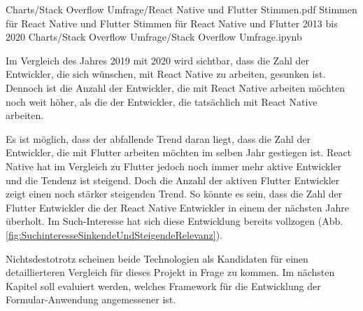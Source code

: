 \begin{alexfigurewithnotebook}{Charts/Stack Overflow Umfrage/React Native und Flutter Stimmen.pdf}
	{Stimmen für React Native und Flutter}
	{Stimmen für React Native und Flutter 2013 bis 2020}
	{Charts/Stack Overflow Umfrage/Stack Overflow Umfrage.ipynb}
	{}
	\label{fig:ReactNativeUndFlutterStimmen}

\end{alexfigurewithnotebook}

Im Vergleich des Jahres 2019 mit 2020 wird sichtbar, dass die Zahl der Entwickler, die sich wünschen, mit React Native zu arbeiten, gesunken ist.
Dennoch ist die Anzahl der Entwickler, die mit React Native arbeiten möchten noch weit höher, als die der Entwickler, die tatsächlich mit React Native arbeiten.

Es ist möglich, dass der abfallende Trend daran liegt, dass die Zahl der Entwickler, die mit Flutter arbeiten möchten im selben Jahr gestiegen ist.
React Native hat im Vergleich zu Flutter jedoch noch immer mehr aktive Entwickler und die Tendenz ist steigend.
Doch die Anzahl der aktiven Flutter Entwickler zeigt einen noch stärker steigenden Trend.
So könnte es sein, dass die Zahl der Flutter Entwickler die der React Native Entwickler in einem der nächsten Jahre überholt.
Im Such-Interesse hat sich diese Entwicklung bereits vollzogen (Abb. \ref{fig:SuchinteresseSinkendeUndSteigendeRelevanz}). 

Nichtsdestotrotz scheinen beide Technologien als Kandidaten für einen detaillierteren Vergleich für dieses Projekt in Frage zu kommen.
Im nächsten Kapitel soll evaluiert werden, welches Framework für die Entwicklung der Formular-Anwendung angemessener ist.



